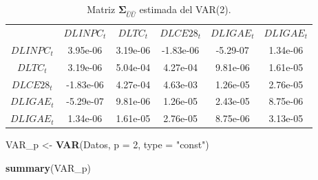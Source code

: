\documentclass[
]{book}
\newenvironment{Shaded}{\begin{snugshade}}{\end{snugshade}}
\newcommand{\AttributeTok}[1]{\textcolor[rgb]{0.13,0.29,0.53}{#1}}
\newcommand{\DecValTok}[1]{\textcolor[rgb]{0.00,0.00,0.81}{#1}}
\newcommand{\FunctionTok}[1]{\textcolor[rgb]{0.13,0.29,0.53}{\textbf{#1}}}
\newcommand{\NormalTok}[1]{#1}
\newcommand{\OtherTok}[1]{\textcolor[rgb]{0.56,0.35,0.01}{#1}}
\newcommand{\StringTok}[1]{\textcolor[rgb]{0.31,0.60,0.02}{#1}}
\begin{document}
\begin{longtable}[]{@{}cccccc@{}}
\caption{\label{tab:SigmaVARp} Matriz \(\mathbf{\Sigma}_{\hat{U}\hat{U}}\) estimada del VAR(2).}\tabularnewline
\toprule\noalign{}
\endfirsthead
\endhead
\bottomrule\noalign{}
\endlastfoot
& \(DLINPC_t\) & \(DLTC_t\) & \(DLCE28_t\) & \(DLIGAE_t\) & \(DLIGAE_t\) \\
\(DLINPC_t\) & 3.95e-06 & 3.19e-06 & -1.83e-06 & -5.29-07 & 1.34e-06 \\
\(DLTC_t\) & 3.19e-06 & 5.04e-04 & 4.27e-04 & 9.81e-06 & 1.61e-05 \\
\(DLCE28_t\) & -1.83e-06 & 4.27e-04 & 4.63e-03 & 1.26e-05 & 2.76e-05 \\
\(DLIGAE_t\) & -5.29e-07 & 9.81e-06 & 1.26e-05 & 2.43e-05 & 8.75e-06 \\
\(DLIGAE_t\) & 1.34e-06 & 1.61e-05 & 2.76e-05 & 8.75e-06 & 3.13e-05 \\
\end{longtable}

\begin{Shaded}
\begin{Highlighting}[]
\NormalTok{VAR\_p }\OtherTok{\textless{}{-}} \FunctionTok{VAR}\NormalTok{(Datos, }\AttributeTok{p =} \DecValTok{2}\NormalTok{, }\AttributeTok{type =} \StringTok{"const"}\NormalTok{)}

\FunctionTok{summary}\NormalTok{(VAR\_p)}
\end{Highlighting}
\end{Shaded}
\end{document}
